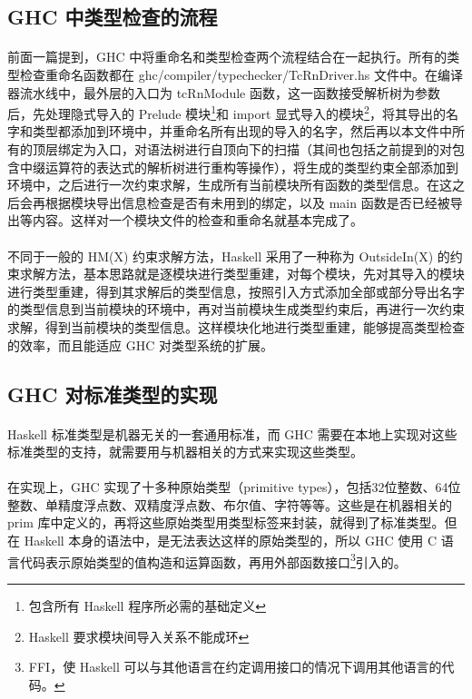 \documentclass{article}
\begin{document}
	\subsection{GHC 中类型检查的流程}
	\paragraph{}
	前面一篇提到，GHC 中将重命名和类型检查两个流程结合在一起执行。所有的类型检查重命名函数都在 ghc/compiler/typechecker/TcRnDriver.hs 文件中。在编译器流水线中，最外层的入口为 tcRnModule 函数，这一函数接受解析树为参数后，先处理隐式导入的 Prelude 模块\footnote{包含所有 Haskell 程序所必需的基础定义}和 import 显式导入的模块\footnote{Haskell 要求模块间导入关系不能成环}，将其导出的名字和类型都添加到环境中，并重命名所有出现的导入的名字，然后再以本文件中所有的顶层绑定为入口，对语法树进行自顶向下的扫描（其间也包括之前提到的对包含中缀运算符的表达式的解析树进行重构等操作），将生成的类型约束全部添加到环境中，之后进行一次约束求解，生成所有当前模块所有函数的类型信息。在这之后会再根据模块导出信息检查是否有未用到的绑定，以及 main 函数是否已经被导出等内容。这样对一个模块文件的检查和重命名就基本完成了。
	\paragraph{}
	不同于一般的 HM(X) 约束求解方法，Haskell 采用了一种称为 OutsideIn(X) 的约束求解方法\cite{outsideinx-modular-type-inference-with-local-assumptions}，基本思路就是逐模块进行类型重建，对每个模块，先对其导入的模块进行类型重建，得到其求解后的类型信息，按照引入方式添加全部或部分导出名字的类型信息到当前模块的环境中，再对当前模块生成类型约束后，再进行一次约束求解，得到当前模块的类型信息。这样模块化地进行类型重建，能够提高类型检查的效率，而且能适应 GHC 对类型系统的扩展。
	\subsection{GHC 对标准类型的实现}
	\paragraph{}
	Haskell 标准类型是机器无关的一套通用标准，而 GHC 需要在本地上实现对这些标准类型的支持，就需要用与机器相关的方式来实现这些类型。
	\paragraph{}
	在实现上，GHC 实现了十多种原始类型（primitive types），包括32位整数、64位整数、单精度浮点数、双精度浮点数、布尔值、字符等等。这些是在机器相关的 prim 库\cite{ghcprim}中定义的，再将这些原始类型用类型标签来封装，就得到了标准类型。但在 Haskell 本身的语法中，是无法表达这样的原始类型的，所以 GHC 使用 C 语言代码表示原始类型的值构造和运算函数，再用外部函数接口\footnote{FFI，使 Haskell 可以与其他语言在约定调用接口的情况下调用其他语言的代码。}引入的。
\end{document}
